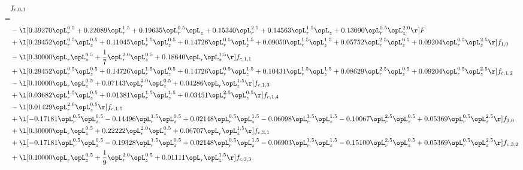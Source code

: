 \begin{alignat}{2} 
\label{eq:f_01_2} 
& f_{c,0,1} \nonumber \\ 
 = \\ 
& - \l[  0.39270 \opL_r^{0.5} +  0.22089 \opL_r^{1.5} +  0.19635 \opL_r^{0.5} \opL_z +  0.15340 \opL_r^{2.5} +  0.14563 \opL_r^{1.5} \opL_z +  0.13090 \opL_r^{0.5} \opL_z^{2.0}  \r] F \nonumber \\ 
& + \l[  0.29452 \opL_r^{0.5} \opL_z^{0.5} +  0.11045 \opL_r^{1.5} \opL_z^{0.5} +  0.14726 \opL_r^{0.5} \opL_z^{1.5} +  0.09050 \opL_r^{1.5} \opL_z^{1.5} +  0.05752 \opL_r^{2.5} \opL_z^{0.5} +  0.09204 \opL_r^{0.5} \opL_z^{2.5}  \r] f_{1,0} \nonumber \\ 
& - \l[  0.30000 \opL_r \opL_z^{0.5} + \frac{1}{7} \opL_r^{2.0} \opL_z^{0.5} +  0.18640 \opL_r \opL_z^{1.5}  \r] f_{c,1,1} \nonumber \\ 
& + \l[  0.29452 \opL_r^{0.5} \opL_z^{0.5} +  0.14726 \opL_r^{1.5} \opL_z^{0.5} +  0.14726 \opL_r^{0.5} \opL_z^{1.5} +  0.10431 \opL_r^{1.5} \opL_z^{1.5} +  0.08629 \opL_r^{2.5} \opL_z^{0.5} +  0.09204 \opL_r^{0.5} \opL_z^{2.5}  \r] f_{c,1,2} \nonumber \\ 
& - \l[  0.10000 \opL_r \opL_z^{0.5} +  0.07143 \opL_r^{2.0} \opL_z^{0.5} +  0.04286 \opL_r \opL_z^{1.5}  \r] f_{c,1,3} \nonumber \\ 
& + \l[  0.03682 \opL_r^{1.5} \opL_z^{0.5} +  0.01381 \opL_r^{1.5} \opL_z^{1.5} +  0.03451 \opL_r^{2.5} \opL_z^{0.5}  \r] f_{c,1,4} \nonumber \\ 
& - \l[  0.01429 \opL_r^{2.0} \opL_z^{0.5}  \r] f_{c,1,5} \nonumber \\ 
& + \l[  -0.17181 \opL_r^{0.5} \opL_z^{0.5}   -0.14496 \opL_r^{1.5} \opL_z^{0.5} +  0.02148 \opL_r^{0.5} \opL_z^{1.5}   -0.06098 \opL_r^{1.5} \opL_z^{1.5}   -0.10067 \opL_r^{2.5} \opL_z^{0.5} +  0.05369 \opL_r^{0.5} \opL_z^{2.5}  \r] f_{3,0} \nonumber \\ 
& + \l[  0.30000 \opL_r \opL_z^{0.5} +  0.22222 \opL_r^{2.0} \opL_z^{0.5} +  0.06707 \opL_r \opL_z^{1.5}  \r] f_{c,3,1} \nonumber \\ 
& + \l[  -0.17181 \opL_r^{0.5} \opL_z^{0.5}   -0.19328 \opL_r^{1.5} \opL_z^{0.5} +  0.02148 \opL_r^{0.5} \opL_z^{1.5}   -0.06903 \opL_r^{1.5} \opL_z^{1.5}   -0.15100 \opL_r^{2.5} \opL_z^{0.5} +  0.05369 \opL_r^{0.5} \opL_z^{2.5}  \r] f_{c,3,2} \nonumber \\ 
& + \l[  0.10000 \opL_r \opL_z^{0.5} + \frac{1}{9} \opL_r^{2.0} \opL_z^{0.5} +  0.01111 \opL_r \opL_z^{1.5}  \r] f_{c,3,3} \nonumber \\ 

\end{alignat}
